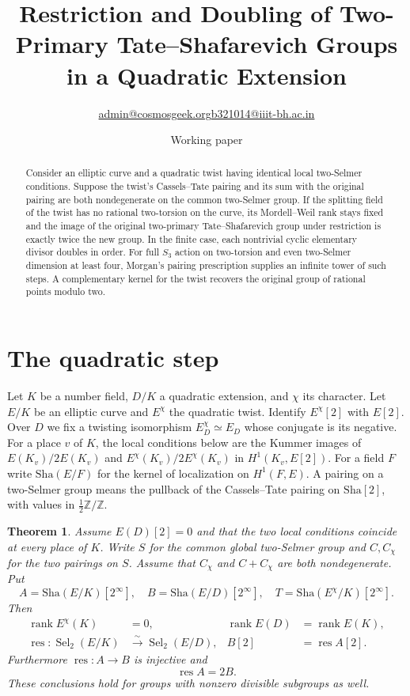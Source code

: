 \documentclass[11pt]{article}
\title{Restriction and Doubling of Two-Primary Tate--Shafarevich Groups in a Quadratic Extension}
\author{\small \href{mailto:admin@cosmosgeek.org}{admin@cosmosgeek.org}\qquad \href{mailto:b321014@iiit-bh.ac.in}{b321014@iiit-bh.ac.in}}
\date{Working paper}
\newtheorem{theorem}{Theorem}
\newcommand{\Sha}{\mathrm{Sha}}
\newcommand{\Sel}{\operatorname{Sel}}
\newcommand{\res}{\operatorname{res}}
\newcommand{\rk}{\operatorname{rank}}
\begin{document}
\maketitle
\begin{abstract}
Consider an elliptic curve and a quadratic twist having identical local
two-Selmer conditions. Suppose the twist's Cassels--Tate pairing and its
sum with the original pairing are both nondegenerate on the common
two-Selmer group. If the splitting field of the twist has no rational
two-torsion on the curve, its Mordell--Weil rank stays fixed and the image
of the original two-primary Tate--Shafarevich group under restriction
is exactly twice the new group. In the finite case, each nontrivial
cyclic elementary divisor doubles in order. For full $S_3$ action on two-torsion and even two-Selmer dimension at least four, Morgan's pairing prescription supplies an infinite tower of such steps. A complementary kernel
for the twist recovers the original group of rational points modulo two.
\end{abstract}

\section{The quadratic step}
Let $K$ be a number field, $D/K$ a quadratic extension, and
$\chi$ its character. Let $E/K$ be an elliptic curve and $E^\chi$
the quadratic twist. Identify $E^\chi[2]$ with $E[2]$. Over $D$ we fix
a twisting isomorphism $E^\chi_D\simeq E_D$ whose conjugate is its negative.
For a place $v$ of $K$, the local conditions below are the Kummer images
of $E(K_v)/2E(K_v)$ and $E^\chi(K_v)/2E^\chi(K_v)$ in $H^1(K_v,E[2])$.
For a field $F$ write $\Sha(E/F)$ for the kernel of localization on
$H^1(F,E)$. A pairing on a two-Selmer group means the pullback of the
Cassels--Tate pairing on $\Sha[2]$, with values in
$\tfrac12\mathbb Z/\mathbb Z$.

\begin{theorem}\label{main}
Assume $E(D)[2]=0$ and that the two local conditions coincide at every
place of $K$. Write $S$ for the common global two-Selmer group and
$C,C_\chi$ for the two pairings on $S$. Assume that $C_\chi$ and
$C+C_\chi$ are both nondegenerate. Put
\[
 A=\Sha(E/K)[2^\infty],\quad B=\Sha(E/D)[2^\infty],\quad
 T=\Sha(E^\chi/K)[2^\infty].
\]
Then
\begin{align*}
 \rk E^\chi(K)&=0,&\rk E(D)&=\rk E(K),\\
 \res:\Sel_2(E/K)&\xrightarrow{\sim}\Sel_2(E/D),&
 B[2]&=\res A[2].
\end{align*}
Furthermore $\res:A\to B$ is injective and
\[
                         \res A=2B.
\]
These conclusions hold for groups with nonzero divisible subgroups as well.
\end{theorem}
\end{document}
